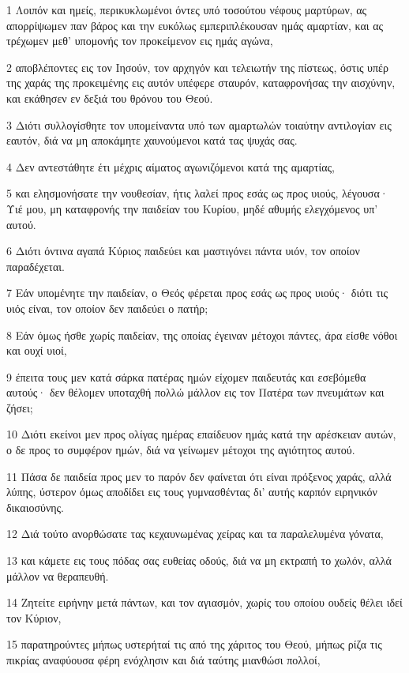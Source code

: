 \par 1 Λοιπόν και ημείς, περικυκλωμένοι όντες υπό τοσούτου νέφους μαρτύρων, ας απορρίψωμεν παν βάρος και την ευκόλως εμπεριπλέκουσαν ημάς αμαρτίαν, και ας τρέχωμεν μεθ' υπομονής τον προκείμενον εις ημάς αγώνα,
\par 2 αποβλέποντες εις τον Ιησούν, τον αρχηγόν και τελειωτήν της πίστεως, όστις υπέρ της χαράς της προκειμένης εις αυτόν υπέφερε σταυρόν, καταφρονήσας την αισχύνην, και εκάθησεν εν δεξιά του θρόνου του Θεού.
\par 3 Διότι συλλογίσθητε τον υπομείναντα υπό των αμαρτωλών τοιαύτην αντιλογίαν εις εαυτόν, διά να μη αποκάμητε χαυνούμενοι κατά τας ψυχάς σας.
\par 4 Δεν αντεστάθητε έτι μέχρις αίματος αγωνιζόμενοι κατά της αμαρτίας,
\par 5 και ελησμονήσατε την νουθεσίαν, ήτις λαλεί προς εσάς ως προς υιούς, λέγουσα· Υιέ μου, μη καταφρονής την παιδείαν του Κυρίου, μηδέ αθυμής ελεγχόμενος υπ' αυτού.
\par 6 Διότι όντινα αγαπά Κύριος παιδεύει και μαστιγόνει πάντα υιόν, τον οποίον παραδέχεται.
\par 7 Εάν υπομένητε την παιδείαν, ο Θεός φέρεται προς εσάς ως προς υιούς· διότι τις υιός είναι, τον οποίον δεν παιδεύει ο πατήρ;
\par 8 Εάν όμως ήσθε χωρίς παιδείαν, της οποίας έγειναν μέτοχοι πάντες, άρα είσθε νόθοι και ουχί υιοί,
\par 9 έπειτα τους μεν κατά σάρκα πατέρας ημών είχομεν παιδευτάς και εσεβόμεθα αυτούς· δεν θέλομεν υποταχθή πολλώ μάλλον εις τον Πατέρα των πνευμάτων και ζήσει;
\par 10 Διότι εκείνοι μεν προς ολίγας ημέρας επαίδευον ημάς κατά την αρέσκειαν αυτών, ο δε προς το συμφέρον ημών, διά να γείνωμεν μέτοχοι της αγιότητος αυτού.
\par 11 Πάσα δε παιδεία προς μεν το παρόν δεν φαίνεται ότι είναι πρόξενος χαράς, αλλά λύπης, ύστερον όμως αποδίδει εις τους γυμνασθέντας δι' αυτής καρπόν ειρηνικόν δικαιοσύνης.
\par 12 Διά τούτο ανορθώσατε τας κεχαυνωμένας χείρας και τα παραλελυμένα γόνατα,
\par 13 και κάμετε εις τους πόδας σας ευθείας οδούς, διά να μη εκτραπή το χωλόν, αλλά μάλλον να θεραπευθή.
\par 14 Ζητείτε ειρήνην μετά πάντων, και τον αγιασμόν, χωρίς του οποίου ουδείς θέλει ιδεί τον Κύριον,
\par 15 παρατηρούντες μήπως υστερήταί τις από της χάριτος του Θεού, μήπως ρίζα τις πικρίας αναφύουσα φέρη ενόχλησιν και διά ταύτης μιανθώσι πολλοί,
